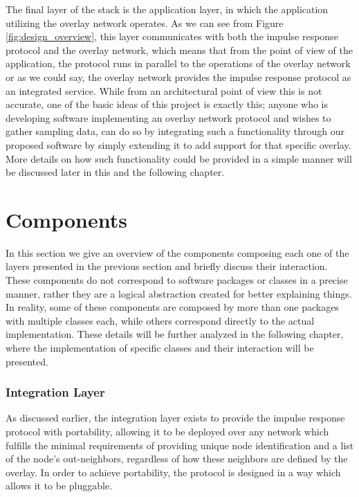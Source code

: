 \documentclass[a4paper,11pt,twoside]{report}
\begin{document}
The final layer of the stack is the application layer, in which the application utilizing the overlay network operates. As we can see from Figure \ref{fig:design_overview}, this layer communicates with both the impulse response protocol and the overlay network, which means that from the point of view of the application, the protocol runs in parallel to the operations of the overlay network or as we could say, the overlay network provides the impulse response protocol as an integrated service. While from an architectural point of view this is not accurate, one of the basic ideas of this project is exactly this; anyone who is developing software implementing an overlay network protocol and wishes to gather sampling data, can do so by integrating such a functionality through our proposed software by simply extending it to add support for that specific overlay. More details on how such functionality could be provided in a simple manner will be discussed later in this and the following chapter.



\section{Components}

In this section we give an overview of the components composing each one of the layers presented in the previous section and briefly discuss their interaction. These components do not correspond to software packages or classes in a precise manner, rather they are a logical abstraction created for better explaining things. In reality, some of these components are composed by more than one packages with multiple classes each, while others correspond directly to the actual implementation. These details will be further analyzed in the following chapter, where the implementation of specific classes and their interaction will be presented.

\subsubsection*{Integration Layer}

As discussed earlier, the integration layer exists to provide the impulse response protocol with portability, allowing it to be deployed over any network which fulfills the minimal requirements of providing unique node identification and a list of the node's out-neighbors, regardless of how these neighbors are defined by the overlay. In order to achieve portability, the protocol is designed in a way which allows it to be pluggable. \\
\end{document}
